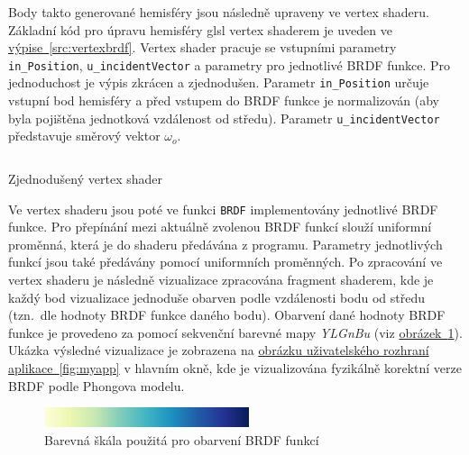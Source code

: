 \documentclass[czech,master]{diploma}
\newcommand{\outVec}{\omega_{o}}
\begin{document}
Body takto generované hemisféry jsou následně upraveny ve vertex shaderu. Základní kód pro úpravu hemisféry glsl vertex shaderem je uveden ve \hyperref[src:vertexbrdf]{výpise~\ref{src:vertexbrdf}}. Vertex shader pracuje se vstupními parametry \texttt{in\_Position}, \texttt{u\_incidentVector} a parametry pro jednotlivé BRDF funkce. Pro jednoduchost je výpis zkrácen a zjednodušen. Parametr \texttt{in\_Position} určuje vstupní bod hemisféry a před vstupem do BRDF funkce je normalizován (aby byla pojištěna jednotková vzdálenost od středu). Parametr \texttt{u\_incidentVector} představuje směrový vektor \(\outVec\).\par

\begin{listing}[ht]
  \inputminted{c++}{sampleshader.glsl}
  \caption{Zjednodušený vertex shader}
  \label{src:vertexbrdf}
\end{listing}

Ve vertex shaderu jsou poté ve funkci \texttt{BRDF} implementovány jednotlivé BRDF funkce. Pro přepínání mezi aktuálně zvolenou BRDF funkcí slouží uniformní proměnná, která je do shaderu předávána z programu. Parametry jednotlivých funkcí jsou také předávány pomocí uniformních proměnných. Po zpracování ve vertex shaderu je následně vizualizace zpracována fragment shaderem, kde je každý bod vizualizace jednoduše obarven podle vzdálenosti bodu od středu (tzn.\ dle hodnoty BRDF funkce daného bodu). Obarvení dané hodnoty BRDF funkce je provedeno za pomocí sekvenční barevné mapy \textit{YLGnBu} (viz \hyperref[fig:ylgnbu]{obrázek~\ref{fig:ylgnbu}}). Ukázka výsledné vizualizace je zobrazena na \hyperref[fig:myapp]{obrázku uživatelského rozhraní aplikace~\ref{fig:myapp}} v hlavním okně, kde je vizualizována fyzikálně korektní verze BRDF podle Phongova modelu.

\begin{figure}[ht]
  \centering
  \includegraphics[width=6cm]{Figures/YlGnBu.png}
  \caption{Barevná škála použitá pro obarvení BRDF funkcí}%
  \label{fig:ylgnbu}%
\end{figure}

\clearpage
\end{document}
